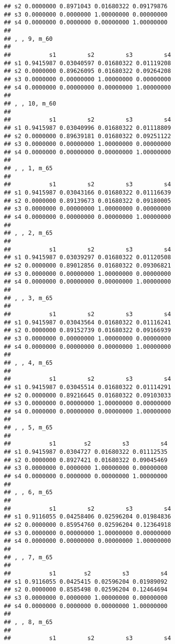 \documentclass[
]{article}
\begin{document}
\begin{verbatim}
## s2 0.0000000 0.8971043 0.01680322 0.09179876
## s3 0.0000000 0.0000000 1.00000000 0.00000000
## s4 0.0000000 0.0000000 0.00000000 1.00000000
## 
## , , 9, m_60
## 
##           s1         s2         s3         s4
## s1 0.9415987 0.03040597 0.01680322 0.01119208
## s2 0.0000000 0.89626095 0.01680322 0.09264208
## s3 0.0000000 0.00000000 1.00000000 0.00000000
## s4 0.0000000 0.00000000 0.00000000 1.00000000
## 
## , , 10, m_60
## 
##           s1         s2         s3         s4
## s1 0.9415987 0.03040996 0.01680322 0.01118809
## s2 0.0000000 0.89639181 0.01680322 0.09251122
## s3 0.0000000 0.00000000 1.00000000 0.00000000
## s4 0.0000000 0.00000000 0.00000000 1.00000000
## 
## , , 1, m_65
## 
##           s1         s2         s3         s4
## s1 0.9415987 0.03043166 0.01680322 0.01116639
## s2 0.0000000 0.89139673 0.01680322 0.09180005
## s3 0.0000000 0.00000000 1.00000000 0.00000000
## s4 0.0000000 0.00000000 0.00000000 1.00000000
## 
## , , 2, m_65
## 
##           s1         s2         s3         s4
## s1 0.9415987 0.03039297 0.01680322 0.01120508
## s2 0.0000000 0.89012856 0.01680322 0.09306821
## s3 0.0000000 0.00000000 1.00000000 0.00000000
## s4 0.0000000 0.00000000 0.00000000 1.00000000
## 
## , , 3, m_65
## 
##           s1         s2         s3         s4
## s1 0.9415987 0.03043564 0.01680322 0.01116241
## s2 0.0000000 0.89152739 0.01680322 0.09166939
## s3 0.0000000 0.00000000 1.00000000 0.00000000
## s4 0.0000000 0.00000000 0.00000000 1.00000000
## 
## , , 4, m_65
## 
##           s1         s2         s3         s4
## s1 0.9415987 0.03045514 0.01680322 0.01114291
## s2 0.0000000 0.89216645 0.01680322 0.09103033
## s3 0.0000000 0.00000000 1.00000000 0.00000000
## s4 0.0000000 0.00000000 0.00000000 1.00000000
## 
## , , 5, m_65
## 
##           s1        s2         s3         s4
## s1 0.9415987 0.0304727 0.01680322 0.01112535
## s2 0.0000000 0.8927421 0.01680322 0.09045469
## s3 0.0000000 0.0000000 1.00000000 0.00000000
## s4 0.0000000 0.0000000 0.00000000 1.00000000
## 
## , , 6, m_65
## 
##           s1         s2         s3         s4
## s1 0.9116055 0.04258406 0.02596204 0.01984836
## s2 0.0000000 0.85954760 0.02596204 0.12364918
## s3 0.0000000 0.00000000 1.00000000 0.00000000
## s4 0.0000000 0.00000000 0.00000000 1.00000000
## 
## , , 7, m_65
## 
##           s1        s2         s3         s4
## s1 0.9116055 0.0425415 0.02596204 0.01989092
## s2 0.0000000 0.8585498 0.02596204 0.12464694
## s3 0.0000000 0.0000000 1.00000000 0.00000000
## s4 0.0000000 0.0000000 0.00000000 1.00000000
## 
## , , 8, m_65
## 
##           s1         s2         s3         s4

\end{verbatim}
\end{document}
